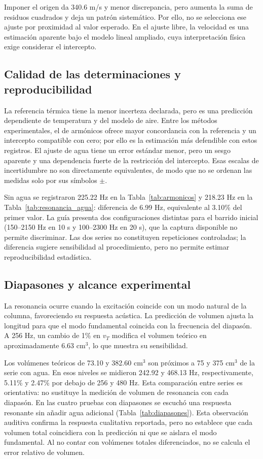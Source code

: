 Imponer el origen da 340.6 m/s y menor discrepancia, pero aumenta la suma de residuos cuadrados y deja un patrón sistemático. Por ello, no se selecciona ese ajuste por proximidad al valor esperado. En el ajuste libre, la velocidad es una estimación aparente bajo el modelo lineal ampliado, cuya interpretación física exige considerar el intercepto.

\subsection{Calidad de las determinaciones y reproducibilidad}
La referencia térmica tiene la menor incerteza declarada, pero es una predicción dependiente de temperatura y del modelo de aire. Entre los métodos experimentales, el de armónicos ofrece mayor concordancia con la referencia y un intercepto compatible con cero; por ello es la estimación más defendible con estos registros. El ajuste de agua tiene un error estándar menor, pero un sesgo aparente y una dependencia fuerte de la restricción del intercepto. Esas escalas de incertidumbre no son directamente equivalentes, de modo que no se ordenan las medidas solo por sus símbolos $\pm$.

Sin agua se registraron 225.22 Hz en la Tabla~\ref{tab:armonicos} y 218.23 Hz en la Tabla~\ref{tab:resonancia_agua}: diferencia de 6.99 Hz, equivalente al 3.10\% del primer valor. La guía presenta dos configuraciones distintas para el barrido inicial (150--2150 Hz en 10 s y 100--2300 Hz en 20 s), que la captura disponible no permite discriminar. Las dos series no constituyen repeticiones controladas; la diferencia sugiere sensibilidad al procedimiento, pero no permite estimar reproducibilidad estadística.

\subsection{Diapasones y alcance experimental}
La resonancia ocurre cuando la excitación coincide con un modo natural de la columna, favoreciendo su respuesta acústica. La predicción de volumen ajusta la longitud para que el modo fundamental coincida con la frecuencia del diapasón. A 256 Hz, un cambio de 1\% en $v_T$ modifica el volumen teórico en aproximadamente 6.63 cm$^3$, lo que muestra su sensibilidad.

Los volúmenes teóricos de 73.10 y 382.60 cm$^3$ son próximos a 75 y 375 cm$^3$ de la serie con agua. En esos niveles se midieron 242.92 y 468.13 Hz, respectivamente, 5.11\% y 2.47\% por debajo de 256 y 480 Hz. Esta comparación entre series es orientativa: no sustituye la medición de volumen de resonancia con cada diapasón. En las cuatro pruebas con diapasones se escuchó una respuesta resonante sin añadir agua adicional (Tabla~\ref{tab:diapasones}). Esta observación auditiva confirma la respuesta cualitativa reportada, pero no establece que cada volumen total coincidiera con la predicción ni que se aislara el modo fundamental. Al no contar con volúmenes totales diferenciados, no se calcula el error relativo de volumen.


